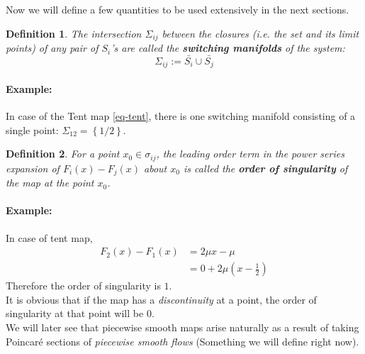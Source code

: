 \documentclass{book}
\renewcommand{\(}{\begin{columns}}
\renewcommand{\)}{\end{columns}}
\newcommand{\<}[1]{\begin{column}{#1}}
\renewcommand{\>}{\end{column}}
\newcommand{\bb}[1]{\textbf{#1}}
\newcommand{\para}{\paragraph}
\newtheorem{definition}{Definition}[section]
\begin{document}
Now we will define a few quantities to be used extensively in the next 
sections.  

\begin{definition}
\label{def-switching_manifold}
The intersection $\Sigma_{ij}$ between the closures (i.e. the set and its limit points) of 
any pair of $S_i$'s are called the \bb{switching manifolds} of the system:\[
\Sigma_{ij}:=\bar{S_i}\cup\bar{S_j}
\]
\end{definition}
\para{Example:}
In case of the Tent map \eqref{eq-tent}, there is one switching manifold 
consisting of a single point:
$\Sigma_{12}=\left\{1/2\right\}$.  

\begin{definition}
\label{def-sing_order}
For a point $x_0\in\sigma_{ij}$, the leading order term in the power series 
expansion of $F_i(x)-F_j(x)$ about $x_0$ is called the \bb{order of singularity} of the 
map at the point $x_0$.  
\end{definition}
\para{Example:}
In case of tent map, 
\begin{align}
F_2(x)-F_1(x)&=2\mu x-\mu\\
&=0+2\mu(x-\frac{1}{2})
\end{align}
Therefore the order of singularity is $1$. \\


It is obvious that if the map has a \emph{discontinuity} at a point, the order 
of singularity at that point will be $0$. \\ 


We will later see that piecewise smooth maps arise naturally as a result of 
taking Poincaré sections of \emph{piecewise smooth flows} (Something we will 
define right now).
\end{document}
